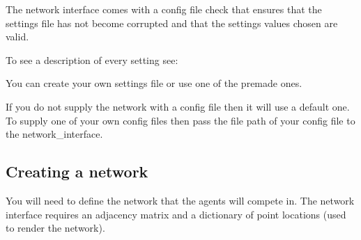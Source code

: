 \documentclass[letterpaper,10pt,english]{sphinxmanual}
\begin{document}
\sphinxAtStartPar
The network interface comes with a config file check that ensures that the settings file
has not become corrupted and that the settings values chosen are valid.

\sphinxAtStartPar
To see a description of every setting see: {\hyperref[\detokenize{source/config_file:config-file}]{}}

\sphinxAtStartPar
You can create your own settings file or use one of the pre\sphinxhyphen{}made ones.

\sphinxAtStartPar
If you do not supply the network with a config file then it will use a default one.
To supply one of your own config files then pass the file path of your config file
to the network\_interface.


\subsection{Creating a network}
\label{\detokenize{source/getting_started:creating-a-network}}
\sphinxAtStartPar
You will need to define the network that the agents will compete in. The network interface
requires an adjacency matrix and a dictionary of point locations (used to render the network).
\end{document}
